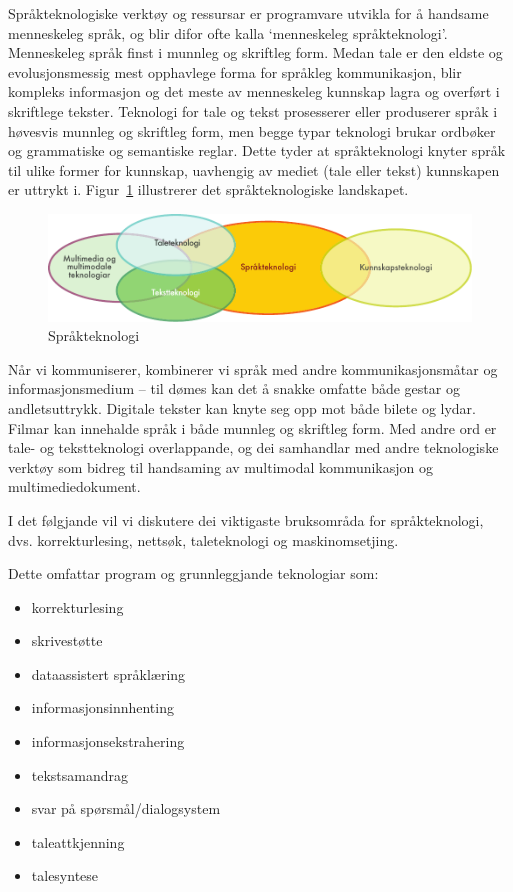 \begin{multicols}{2}

Språkteknologiske verktøy og ressursar er programvare utvikla for å handsame menneskeleg språk, og blir difor ofte kalla `menneskeleg språkteknologi'. 
Menneskeleg språk finst i munnleg og skriftleg form. Medan tale er den eldste og evolusjonsmessig mest opphavlege forma for språkleg kommunikasjon, blir kompleks informasjon og det meste av menneskeleg kunnskap lagra og overført i skriftlege tekster. Teknologi for tale og tekst prosesserer eller produserer språk i høvesvis munnleg og skriftleg form, men begge typar teknologi brukar ordbøker og grammatiske og semantiske reglar. Dette tyder at språkteknologi knyter språk til ulike former for kunnskap, uavhengig av mediet (tale eller tekst) kunnskapen er uttrykt i. Figur~\ref{fig:ltincontext_no} illustrerer det språkteknologiske landskapet.

\begin{figure}[htb]
  \center
  \includegraphics[width=\textwidth]{../_media/norwegian-nynorsk/language_technologies}
  \caption{Språkteknologi}
  \label{fig:ltincontext_no}
\end{figure}

Når vi kommuniserer, kombinerer vi språk med andre kommunikasjonsmåtar
og informasjonsmedium – til dømes kan det å snakke omfatte både gestar
og andletsuttrykk. Digitale tekster kan knyte seg opp mot både bilete
og lydar. Filmar kan innehalde språk i både munnleg og skriftleg
form. Med andre ord er tale- og tekstteknologi overlappande, og dei
samhandlar med andre teknologiske verktøy som bidreg til handsaming av
multimodal kommunikasjon og multimediedokument.

I det følgjande vil vi diskutere dei viktigaste bruksområda for språkteknologi, dvs. korrekturlesing, nettsøk, taleteknologi og maskinomsetjing. 

Dette omfattar program og grunnleggjande teknologiar som:

\begin{itemize}
\item korrekturlesing
\item skrivestøtte
\item dataassistert språklæring
\item informasjonsinnhenting  
\item informasjonsekstrahering
\item tekstsamandrag
\item svar på spørsmål/dialogsystem
\item taleattkjenning 
\item talesyntese 
\end{itemize}


\end{multicols}
